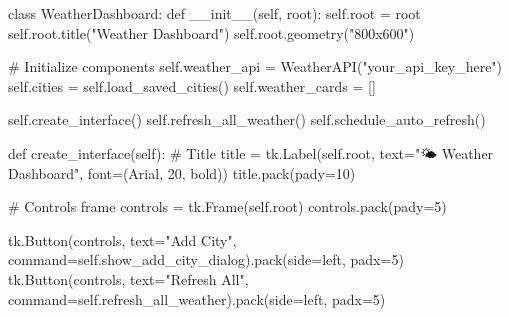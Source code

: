 \documentclass[
  letterpaper,
  DIV=11,
  numbers=noendperiod,
  oneside]{scrreprt}
\newenvironment{Shaded}{}{}
\newcommand{\CommentTok}[1]{\textcolor[rgb]{0.42,0.45,0.49}{#1}}
\newcommand{\DecValTok}[1]{\textcolor[rgb]{0.00,0.36,0.77}{#1}}
\newcommand{\FunctionTok}[1]{\textcolor[rgb]{0.44,0.26,0.76}{#1}}
\newcommand{\KeywordTok}[1]{\textcolor[rgb]{0.84,0.23,0.29}{#1}}
\newcommand{\NormalTok}[1]{\textcolor[rgb]{0.14,0.16,0.18}{#1}}
\newcommand{\OperatorTok}[1]{\textcolor[rgb]{0.14,0.16,0.18}{#1}}
\newcommand{\StringTok}[1]{\textcolor[rgb]{0.01,0.18,0.38}{#1}}
\newcommand{\VariableTok}[1]{\textcolor[rgb]{0.89,0.38,0.04}{#1}}
\begin{document}
\begin{Shaded}
\begin{Highlighting}[]
\KeywordTok{class}\NormalTok{ WeatherDashboard:}
    \KeywordTok{def} \FunctionTok{\_\_init\_\_}\NormalTok{(}\VariableTok{self}\NormalTok{, root):}
        \VariableTok{self}\NormalTok{.root }\OperatorTok{=}\NormalTok{ root}
        \VariableTok{self}\NormalTok{.root.title(}\StringTok{"Weather Dashboard"}\NormalTok{)}
        \VariableTok{self}\NormalTok{.root.geometry(}\StringTok{"800x600"}\NormalTok{)}
        
        \CommentTok{\# Initialize components}
        \VariableTok{self}\NormalTok{.weather\_api }\OperatorTok{=}\NormalTok{ WeatherAPI(}\StringTok{"your\_api\_key\_here"}\NormalTok{)}
        \VariableTok{self}\NormalTok{.cities }\OperatorTok{=} \VariableTok{self}\NormalTok{.load\_saved\_cities()}
        \VariableTok{self}\NormalTok{.weather\_cards }\OperatorTok{=}\NormalTok{ []}
        
        \VariableTok{self}\NormalTok{.create\_interface()}
        \VariableTok{self}\NormalTok{.refresh\_all\_weather()}
        \VariableTok{self}\NormalTok{.schedule\_auto\_refresh()}
    
    \KeywordTok{def}\NormalTok{ create\_interface(}\VariableTok{self}\NormalTok{):}
        \CommentTok{\# Title}
\NormalTok{        title }\OperatorTok{=}\NormalTok{ tk.Label(}\VariableTok{self}\NormalTok{.root, text}\OperatorTok{=}\StringTok{"🌤️ Weather Dashboard"}\NormalTok{, }
\NormalTok{                        font}\OperatorTok{=}\NormalTok{(}\StringTok{\textquotesingle{}Arial\textquotesingle{}}\NormalTok{, }\DecValTok{20}\NormalTok{, }\StringTok{\textquotesingle{}bold\textquotesingle{}}\NormalTok{))}
\NormalTok{        title.pack(pady}\OperatorTok{=}\DecValTok{10}\NormalTok{)}
        
        \CommentTok{\# Controls frame}
\NormalTok{        controls }\OperatorTok{=}\NormalTok{ tk.Frame(}\VariableTok{self}\NormalTok{.root)}
\NormalTok{        controls.pack(pady}\OperatorTok{=}\DecValTok{5}\NormalTok{)}
        
\NormalTok{        tk.Button(controls, text}\OperatorTok{=}\StringTok{"Add City"}\NormalTok{, }
\NormalTok{                 command}\OperatorTok{=}\VariableTok{self}\NormalTok{.show\_add\_city\_dialog).pack(side}\OperatorTok{=}\StringTok{\textquotesingle{}left\textquotesingle{}}\NormalTok{, padx}\OperatorTok{=}\DecValTok{5}\NormalTok{)}
\NormalTok{        tk.Button(controls, text}\OperatorTok{=}\StringTok{"Refresh All"}\NormalTok{, }
\NormalTok{                 command}\OperatorTok{=}\VariableTok{self}\NormalTok{.refresh\_all\_weather).pack(side}\OperatorTok{=}\StringTok{\textquotesingle{}left\textquotesingle{}}\NormalTok{, padx}\OperatorTok{=}\DecValTok{5}\NormalTok{)}
        

\end{Highlighting}
\end{Shaded}
\end{document}
